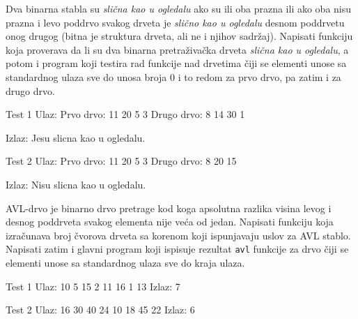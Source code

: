 \begin{Exercise}[label=713]
Dva binarna stabla su \textit{slična kao u ogledalu} ako su ili oba prazna ili ako oba nisu prazna i levo poddrvo svakog drveta je \textit{slično kao u ogledalu} desnom poddrvetu onog drugog (bitna je struktura drveta, ali ne i njihov sadržaj). Napisati funkciju koja proverava da li su dva binarna pretraživačka drveta \textit{slična kao u ogledalu}, a potom i program koji testira rad funkcije nad drvetima čiji se elementi unose sa standardnog ulaza sve do unosa broja 0 i to redom za prvo drvo, pa zatim i za drugo drvo. 

\begin{miditest}
\begin{test}{Test 1}
Ulaz: 
Prvo drvo: 11 20 5 3
Drugo drvo: 8 14 30 1

Izlaz: 
Jesu slicna kao u ogledalu.
\end{test}
\end{miditest}

\begin{miditest}
\begin{test}{Test 2}
Ulaz: 
Prvo drvo: 11 20 5 3
Drugo drvo: 8 20 15

Izlaz: 
Nisu slicna kao u ogledalu.
\end{test}
\end{miditest}

\end{Exercise}


\begin{Exercise}[label=714]
AVL-drvo je binarno drvo pretrage kod koga apsolutna razlika visina levog i desnog poddrveta svakog elementa
nije veća od jedan. Napisati funkciju  koja izračunava broj čvorova drveta sa korenom  koji ispunjavaju uslov za AVL stablo. Napisati zatim i glavni program koji ispisuje rezultat \verb|avl| funkcije za drvo čiji se elementi unose sa standardnog ulaza sve do kraja ulaza.

\begin{miditest}
\begin{test}{Test 1}
Ulaz: 
10 5 15 2 11 16 1 13
Izlaz: 
7
\end{test}
\end{miditest}

\begin{miditest}
\begin{test}{Test 2}
Ulaz: 
16 30 40 24 10 18 45 22
Izlaz: 
6
\end{test}
\end{miditest}
\end{Exercise}


